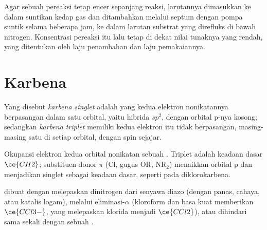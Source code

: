 \begin{inthelab}
Agar sebuah pereaksi tetap encer sepanjang reaksi, larutannya dimasukkan ke dalam
suntikan kedap gas dan ditambahkan melalui septum dengan pompa suntik selama beberapa
jam, ke dalam larutan substrat yang direfluks di bawah nitrogen. Konsentrasi
pereaksi itu lalu tetap di dekat nilai tunaknya yang rendah, yang ditentukan oleh
laju penambahan dan laju pemakaiannya.
\end{inthelab}

\section{Karbena}

\begin{definition}\label{def:b3:radicals-carbenes:carbene-states}
Yang disebut \emph{karbena singlet} adalah  yang kedua elektron nonikatannya
berpasangan dalam satu orbital, yaitu hibrida $sp^2$, dengan orbital p-nya kosong; sedangkan
\emph{karbena triplet} memiliki kedua elektron itu tidak berpasangan, masing-masing satu di setiap
orbital, dengan spin sejajar.
\end{definition}

\begin{omfigure}

{\small Okupansi elektron kedua orbital nonikatan sebuah . Triplet adalah
keadaan dasar $\ce{CH2}$; substituen donor $\pi$ (Cl, gugus OR, $\mathrm{NR_2}$) menaikkan
orbital p dan menjadikan singlet sebagai keadaan dasar, seperti pada diklorokarbena.}
\end{omfigure}

 dibuat dengan melepaskan dinitrogen dari senyawa diazo (dengan panas, cahaya,
atau katalis logam), melalui eliminasi-$\alpha$ (kloroform dan basa kuat memberikan
$\ce{CCl3-}$, yang melepaskan klorida menjadi $\ce{CCl2}$), atau dihindari sama sekali dengan
sebuah .

